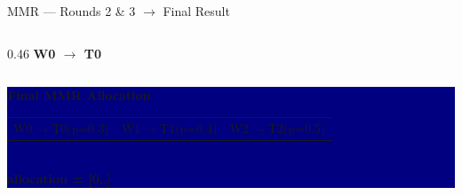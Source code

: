\documentclass[aspectratio=169,10pt]{beamer}
\begin{document}
\begin{frame}{MMR --- Rounds 2 \& 3 $\rightarrow$ Final Result}
\begin{columns}[T]
\begin{column}{0.46\textwidth}
      \vspace{4pt}
      {\small\bfseries\color{navydark} W0 $\to$ T0}
    \end{column}
  \end{columns}

  \vspace{0.25cm}
  \colorbox{navy}{\begin{minipage}{\linewidth}
    \vspace{0.15cm}\centering
    {\color{teal}\bfseries Final MMR Allocation}\\[0.15cm]
    \begin{tabular}{ccc}
      \colorbox{navymidHex}{\color{white}\small W0$\to$T0\;(p=0.3)} &
      \colorbox{navymidHex}{\color{white}\small W1$\to$T1\;(p=0.4)} &
      \colorbox{navymidHex}{\color{white}\small W2$\to$T2\;(p=0.5)}
    \end{tabular}\\[0.15cm]
    {\color{amber}\bfseries allocation = [0,,]}
    \vspace{0.15cm}
  \end{minipage}}
\end{frame}
\end{document}
